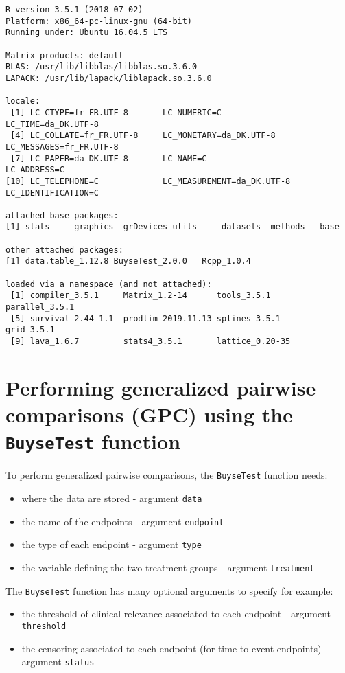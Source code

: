 \documentclass[12pt]{article}
\begin{document}
\begin{verbatim}
R version 3.5.1 (2018-07-02)
Platform: x86_64-pc-linux-gnu (64-bit)
Running under: Ubuntu 16.04.5 LTS

Matrix products: default
BLAS: /usr/lib/libblas/libblas.so.3.6.0
LAPACK: /usr/lib/lapack/liblapack.so.3.6.0

locale:
 [1] LC_CTYPE=fr_FR.UTF-8       LC_NUMERIC=C               LC_TIME=da_DK.UTF-8       
 [4] LC_COLLATE=fr_FR.UTF-8     LC_MONETARY=da_DK.UTF-8    LC_MESSAGES=fr_FR.UTF-8   
 [7] LC_PAPER=da_DK.UTF-8       LC_NAME=C                  LC_ADDRESS=C              
[10] LC_TELEPHONE=C             LC_MEASUREMENT=da_DK.UTF-8 LC_IDENTIFICATION=C       

attached base packages:
[1] stats     graphics  grDevices utils     datasets  methods   base     

other attached packages:
[1] data.table_1.12.8 BuyseTest_2.0.0   Rcpp_1.0.4       

loaded via a namespace (and not attached):
 [1] compiler_3.5.1     Matrix_1.2-14      tools_3.5.1        parallel_3.5.1    
 [5] survival_2.44-1.1  prodlim_2019.11.13 splines_3.5.1      grid_3.5.1        
 [9] lava_1.6.7         stats4_3.5.1       lattice_0.20-35
\end{verbatim}

\clearpage

\section{Performing generalized pairwise comparisons (GPC) using the \texttt{BuyseTest} function}
\label{sec:org0272417}

To perform generalized pairwise comparisons, the \texttt{BuyseTest} function needs:
\begin{itemize}
\item where the data are stored \hfill - argument \texttt{data}
\item the name of the endpoints \hfill - argument \texttt{endpoint}
\item the type of each endpoint \hfill - argument \texttt{type}
\item the variable defining the two treatment groups \hfill - argument
\texttt{treatment}
\end{itemize}
The \texttt{BuyseTest} function has many optional arguments to specify for example:
\begin{itemize}
\item the threshold of clinical relevance associated to each endpoint \hfill - argument \texttt{threshold}
\item the censoring associated to each endpoint (for time to event endpoints) \hfill - argument \texttt{status}
\end{itemize}
\end{document}
